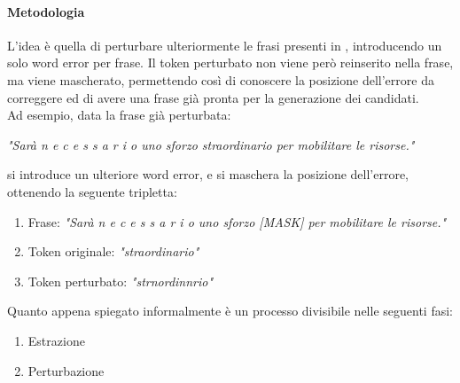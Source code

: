 \paragraph{Metodologia} L'idea è quella di perturbare ulteriormente le frasi presenti in \dstb, introducendo un solo word error per frase. Il token perturbato non viene però reinserito nella frase, ma viene mascherato, permettendo così di conoscere la posizione dell'errore da correggere ed di avere una frase già pronta per la generazione dei candidati.\\
Ad esempio, data la frase già perturbata:
\begin{center}
\textit{"Sarà n e c e s s a r i o uno sforzo straordinario per mobilitare le risorse."}
\end{center}
si introduce un ulteriore word error, e si maschera la posizione dell'errore, ottenendo la seguente tripletta:
\begin{enumerate}
\item Frase: \textit{"Sarà n e c e s s a r i o uno sforzo [MASK] per mobilitare le risorse."}
\item Token originale: \textit{"straordinario"}
\item Token perturbato: \textit{"strnordinnrio"}
\end{enumerate}
Quanto appena spiegato informalmente è un processo divisibile nelle seguenti fasi:
\begin{enumerate}
\item Estrazione
\item Perturbazione
\end{enumerate}

